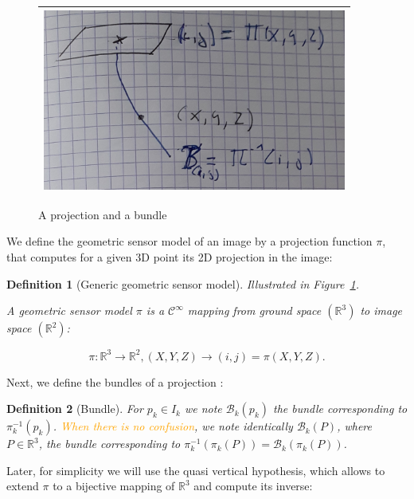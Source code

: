 \documentclass{ipol}
\newcommand{\RR}{\ensuremath{\mathbb{R}}}
\newcommand{\Bund}[1]{\ensuremath{\mathcal{B}_{#1}}}
\newcommand{\BundK}{\Bund{k}}
\newtheorem{definition}{Definition}
\newcommand{\er}[1]{\textcolor{orange}{#1}}
\begin{document}
\begin{figure}
\centering
\begin{tabular}{||c||}
 \hline \hline
\includegraphics[width=10cm]{FIGS/NotaProj.jpg} 
 \\ \hline \hline
\end{tabular}
\caption{A projection and a bundle}
\label{FigNotaProj}
\end{figure}




We define the geometric sensor model of an image by a projection function $\pi$, that computes for a given 3D
point its 2D projection in the image:

\begin{definition}[Generic geometric sensor model]  

\emph{Illustrated in Figure~\ref{FigNotaProj}.}

A geometric sensor model $\pi$ is a $\mathcal{C}^{\infty}$ mapping from ground space $(\RR^3)$ to image space $(\RR^2)$:

\begin{equation}
  \pi :  \RR^3  \rightarrow \RR^2  ,  (X,Y,Z)  \rightarrow (i,j) = \pi(X,Y,Z). \label{Eq:Proj}
\end{equation}
\end{definition}

\noindent Next, we define the bundles of a projection :

\begin{definition}[Bundle]
For $p_k \in I_k$ we note $\BundK(p_k)$  the bundle corresponding to $\pi_k^{-1}(p_k)$. \er{When there is no confusion},
we note identically  $\BundK(P)$, where $P\in \RR^3$,
 the bundle corresponding to $\pi_k^{-1}(\pi_k(P)) = \BundK(\pi_k(P))$.
\end{definition}


\noindent Later, for simplicity we will use the  {quasi vertical} hypothesis, which allows to extend $\pi$ to a
bijective mapping of $\RR^3$ and compute its inverse:
\end{document}
